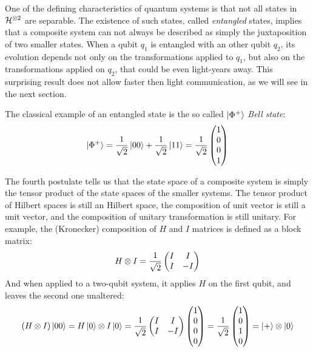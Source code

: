 One of the defining characteristics of quantum systems is that not all states in $\mathcal{H}^{\otimes 2}$ are separable. The existence of such states, called \textit{entangled} states, implies that a composite system can not always be described as simply the juxtaposition of two smaller states. When a qubit $q_1$ is entangled with an other qubit $q_2$, its evolution depends not only on the transformations applied to $q_1$, but also on the transformations applied on $q_2$, that could be even light-years away. This surprising result does not allow faster then light communication, as we will see in the next section.

The classical example of an entangled state is the so called $\ket{\Phi^+}$ \textit{Bell state}:
\[\ket{\Phi^+} = \frac{1}{\sqrt{2}}\ket{00} + \frac{1}{\sqrt{2}}\ket{11} = \frac{1}{\sqrt{2}}\begin{pmatrix}
1 \\ 0 \\ 0\\ 1
\end{pmatrix}
\]

The fourth postulate tells us that the state space of a composite system is simply the tensor product of the state spaces of the smaller systems. The tensor product of Hilbert spaces is still an Hilbert space, the composition of unit vector is still a unit vector, and the composition of unitary transformation is still unitary. For example, the (Kronecker) composition of $H$ and $I$ matrices is defined as a block matrix:
\[	H\otimes I = \frac{1}{\sqrt{2}}\begin{pmatrix}
	I & I \\ I & -I
	\end{pmatrix}\]
And when applied to a two-qubit system, it applies $H$ on the first qubit, and leaves the second one unaltered:
\[ (H\otimes I) \ket{00} = H\ket{0} \otimes I\ket{0} = \frac{1}{\sqrt{2}} \begin{pmatrix}
	I & I \\ I & -I
	\end{pmatrix} \begin{pmatrix}
	1 \\ 0 \\0 \\0
	\end{pmatrix} = \frac{1}{\sqrt{2}} \begin{pmatrix}
	1 \\ 0 \\ 1 \\ 0
	\end{pmatrix} = \ket{+}\otimes\ket{0}
\]


